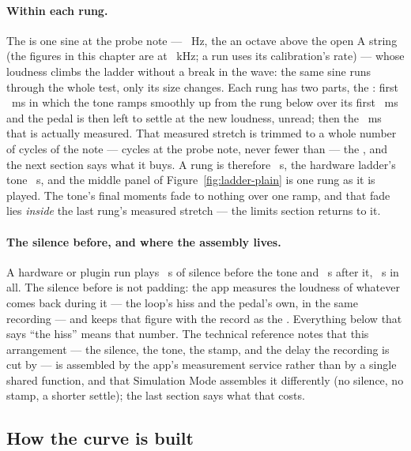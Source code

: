 \documentclass[11pt,a4paper]{article}
\begin{document}
\paragraph{Within each rung.} The  is one sine at the
probe note --- \cmpNoteHz{}~Hz, the \cmpNoteName{} an octave above the
open A string (the figures in this chapter are at \cmpSampleRateKHz{}~kHz;
a run uses its calibration's rate) --- whose loudness climbs the ladder
without a break in the wave: the same sine runs through the whole
test, only its size changes. Each rung has two parts, the
: first \cmpSettleMs{}~ms in which the tone ramps
smoothly up from the rung below over its first \cmpRampMs{}~ms and the
pedal is then left to settle at the new loudness, unread; then the
\cmpMeasureMs{}~ms that is actually measured. That measured stretch is
trimmed to a whole number of cycles of the note --- \cmpMeasureCycles{}
cycles at the probe note, never fewer than \cmpMinimumCycles{} --- the
, and the next section says what it buys. A rung is
therefore \cmpStepS{}~s, the hardware ladder's tone \cmpToneS{}~s, and the
middle panel of Figure~\ref{fig:ladder-plain} is one rung as it is
played. The tone's final moments fade to nothing over one ramp, and that
fade lies \emph{inside} the last rung's measured stretch --- the limits
section returns to it.

\paragraph{The silence before, and where the assembly lives.} A hardware
or plugin run plays \cmpPrerollS{}~s of silence before the tone and
\cmpTailS{}~s after it, \cmpStimulusS{}~s in all. The silence before is
not padding: the app measures the loudness of whatever comes back during
it --- the loop's hiss and the pedal's own, in the same recording --- and
keeps that figure with the record as the . Everything
below that says ``the hiss'' means that number. The technical reference
notes that this arrangement --- the silence, the tone, the stamp, and the
delay the recording is cut by --- is assembled by the app's measurement
service rather than by a single shared function, and that Simulation Mode
assembles it differently (no silence, no stamp, a shorter settle); the
last section says what that costs.

\subsection{How the curve is built}
\end{document}
